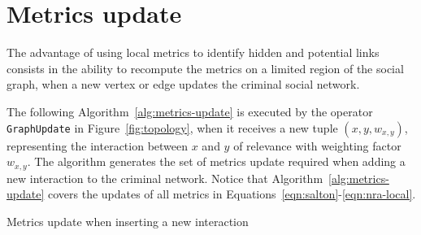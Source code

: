 \section{Metrics update}
\label{sec:metrics-update}

The advantage of using local metrics to identify hidden and potential links consists in the ability to recompute the metrics on a limited region of the social graph, when a new vertex or edge updates the criminal social network.

The following Algorithm~\ref{alg:metrics-update} is executed by the operator \texttt{GraphUpdate} in Figure~\ref{fig:topology}, when it receives a new tuple $(x,y,w_{x,y})$, representing the interaction between $x$ and $y$ of relevance with weighting factor $w_{x,y}$. 
%
The algorithm generates the set of metrics update required when adding a new interaction to the criminal network.
%
Notice that Algorithm~\ref{alg:metrics-update} covers the updates of all metrics in Equations~\ref{eqn:salton}-\ref{eqn:nra-local}.

\begin{algorithm}[h!]
  
  \vspace{1em}
  
   {
  	




  }
  
  \vspace{1em}
  
  \vspace{1em}
  \caption{Metrics update when inserting a new interaction}
  \label{alg:metrics-update}
\end{algorithm}

